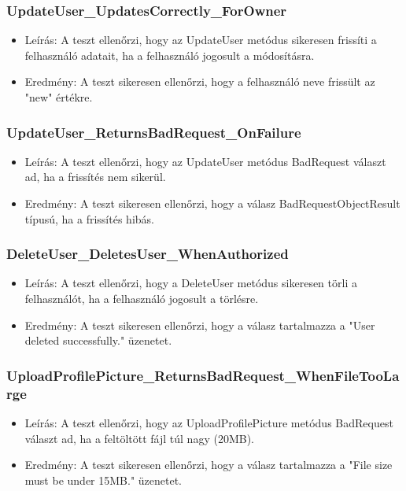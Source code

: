 \documentclass[11pt]{article}
\begin{document}
\subsubsection{UpdateUser\_UpdatesCorrectly\_ForOwner}
\label{sec:org840da5b}
\begin{itemize}
\item Leírás: A teszt ellenőrzi, hogy az UpdateUser metódus sikeresen frissíti a felhasználó adatait, ha a felhasználó jogosult a módosításra.
\item Eredmény: A teszt sikeresen ellenőrzi, hogy a felhasználó neve frissült az "new" értékre.
\end{itemize}
\subsubsection{UpdateUser\_ReturnsBadRequest\_OnFailure}
\label{sec:org54f742b}
\begin{itemize}
\item Leírás: A teszt ellenőrzi, hogy az UpdateUser metódus BadRequest választ ad, ha a frissítés nem sikerül.
\item Eredmény: A teszt sikeresen ellenőrzi, hogy a válasz BadRequestObjectResult típusú, ha a frissítés hibás.
\end{itemize}
\subsubsection{DeleteUser\_DeletesUser\_WhenAuthorized}
\label{sec:org5d183ea}
\begin{itemize}
\item Leírás: A teszt ellenőrzi, hogy a DeleteUser metódus sikeresen törli a felhasználót, ha a felhasználó jogosult a törlésre.
\item Eredmény: A teszt sikeresen ellenőrzi, hogy a válasz tartalmazza a "User deleted successfully." üzenetet.
\end{itemize}
\subsubsection{UploadProfilePicture\_ReturnsBadRequest\_WhenFileTooLarge}
\label{sec:org0c2efc9}
\begin{itemize}
\item Leírás: A teszt ellenőrzi, hogy az UploadProfilePicture metódus BadRequest választ ad, ha a feltöltött fájl túl nagy (20MB).
\item Eredmény: A teszt sikeresen ellenőrzi, hogy a válasz tartalmazza a "File size must be under 15MB." üzenetet.
\end{itemize}
\end{document}
